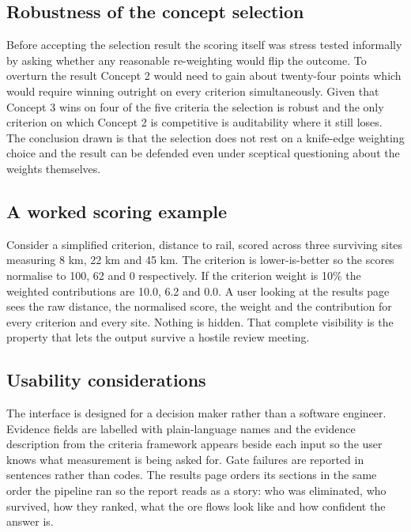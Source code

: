 \documentclass[12pt,a4paper]{report}
\begin{document}
\subsection{Robustness of the concept selection}
Before accepting the selection result the scoring itself was stress
tested informally by asking whether any reasonable re-weighting would
flip the outcome. To overturn the result Concept 2 would need to gain
about twenty-four points which would require winning outright on every
criterion simultaneously. Given that Concept 3 wins on four of the
five criteria the selection is robust and the only criterion on which
Concept 2 is competitive is auditability where it still loses. The
conclusion drawn is that the selection does not rest on a knife-edge
weighting choice and the result can be defended even under sceptical
questioning about the weights themselves.

\subsection{A worked scoring example}
Consider a simplified criterion, distance to rail, scored across three
surviving sites measuring 8 km, 22 km and 45 km. The criterion is
lower-is-better so the scores normalise to 100, 62 and 0 respectively.
If the criterion weight is 10\% the weighted contributions are 10.0,
6.2 and 0.0. A user looking at the results page sees the raw distance,
the normalised score, the weight and the contribution for every
criterion and every site. Nothing is hidden. That complete visibility
is the property that lets the output survive a hostile review meeting.

\subsection{Usability considerations}
The interface is designed for a decision maker rather than a software
engineer. Evidence fields are labelled with plain-language names and
the evidence description from the criteria framework appears beside
each input so the user knows what measurement is being asked for.
Gate failures are reported in sentences rather than codes. The
results page orders its sections in the same order the pipeline ran
so the report reads as a story: who was eliminated, who survived, how
they ranked, what the ore flows look like and how confident the answer
is.
\end{document}
